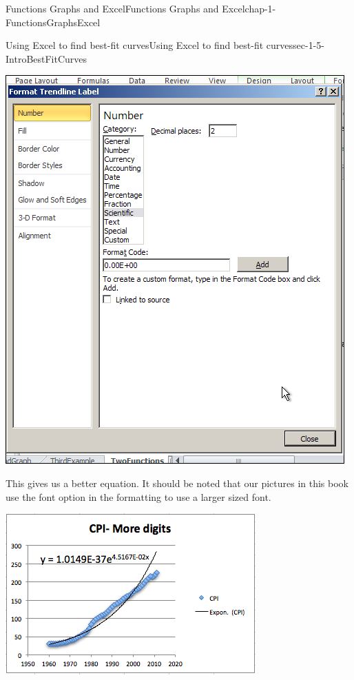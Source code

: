 \documentclass[oneside,10pt,]{book}
\numberwithin{equation}{section}
\begin{document}
\begin{chapterptx}{Functions Graphs and Excel}{}{Functions Graphs and Excel}{}{}{chap-1-FunctionsGraphsExcel}
\begin{sectionptx}{Using Excel to find best-fit curves}{}{Using Excel to find best-fit curves}{}{}{sec-1-5-IntroBestFitCurves}
\begin{sidebyside}{1}{0.1}{0.1}{0}%
\begin{sbspanel}{0.8}%
\includegraphics[width=1\linewidth]{images/sec1-5-11.png}
\end{sbspanel}%
\end{sidebyside}%
%
\par
\hypertarget{p-399}{}%
This gives us a better equation.  It should be noted that our pictures in this book use the font option in the formatting to use a larger sized font. \leavevmode%
\begin{sidebyside}{1}{0.1}{0.1}{0}%
\begin{sbspanel}{0.8}%
\includegraphics[width=1\linewidth]{images/sec1-5-12.png}

\end{sbspanel}
\end{sidebyside}
\end{sectionptx}
\end{chapterptx}
\end{document}
